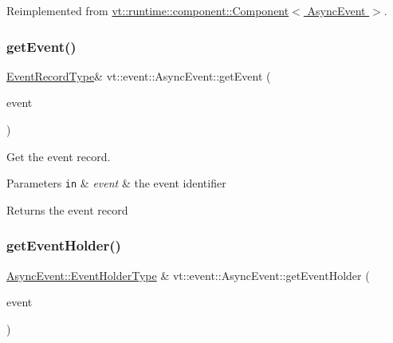 Reimplemented from \hyperlink{structvt_1_1runtime_1_1component_1_1_component_a098e362de01af6054e5491fba671a959}{vt\+::runtime\+::component\+::\+Component$<$ Async\+Event $>$}.

\mbox{\label{structvt_1_1event_1_1_async_event_a78e777586ef948a4436b8dcea3c33be4}} 
\subsubsection{\texorpdfstring{get\+Event()}{getEvent()}}
{\footnotesize\ttfamily \hyperlink{structvt_1_1event_1_1_async_event_a5b4ef37db6e5962fdc0e6e0e56e74bc1}{Event\+Record\+Type}\& vt\+::event\+::\+Async\+Event\+::get\+Event (\begin{DoxyParamCaption}\item[{\hyperlink{namespacevt_a009267401def7ae8bf201892222d060f}{Event\+Type} const \&}]{event }\end{DoxyParamCaption})}



Get the event record. 


\begin{DoxyParams}[1]{Parameters}
\mbox{\tt in}  & {\em event} & the event identifier\\
\hline
\end{DoxyParams}
\begin{DoxyReturn}{Returns}
the event record 
\end{DoxyReturn}
\mbox{\label{structvt_1_1event_1_1_async_event_a27d14dba4b35f66aad75d46fb56227a9}} 
\subsubsection{\texorpdfstring{get\+Event\+Holder()}{getEventHolder()}}
{\footnotesize\ttfamily \hyperlink{structvt_1_1event_1_1_async_event_a6b529d829ccb5b12c50c2b1978c41a86}{Async\+Event\+::\+Event\+Holder\+Type} \& vt\+::event\+::\+Async\+Event\+::get\+Event\+Holder (\begin{DoxyParamCaption}\item[{\hyperlink{namespacevt_a009267401def7ae8bf201892222d060f}{Event\+Type} const \&}]{event }\end{DoxyParamCaption})}




